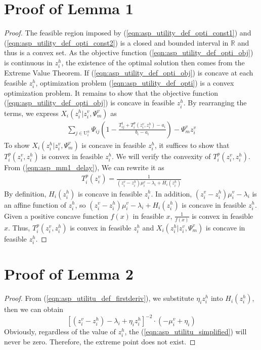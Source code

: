 \documentclass[10pt,journal, compsoc]{IEEEtran}
\begin{document}
    \section{Proof of Lemma 1}\label{appendix:lemma_1}
    \begin{proof}
    The feasible region imposed by (\ref{eqn:asp_utility_def_opti_const1}) and (\ref{eqn:asp_utility_def_opti_const2}) is a closed and bounded interval in $\mathbb{R}$ and thus is a convex set. As the objective function (\ref{eqn:asp_utility_def_opti_obj}) is continuous in $z_i^h$, the existence of the optimal solution then comes from the Extreme Value Theorem. If (\ref{eqn:asp_utility_def_opti_obj}) is concave at each feasible $z_i^h$, optimization problem (\ref{eqn:asp_utility_def_opti}) is a convex optimization problem. It remains to show that the objective function (\ref{eqn:asp_utility_def_opti_obj}) is concave in feasible $z_i^h$. By rearranging the terms, we express $X_i(z_i^h|z_i^v,\Psi_m^v)$ as
    \begin{equation}
    \begin{aligned}
        \sum_{j \in \mathrm{U}_i^{n}}\Psi_{ij}(1-\frac{T_{ij}^t+T_i^p(z_i^v, z_i^h)-a_i}{b_i-a_i})- \Psi_m^v z_i^v 
    \end{aligned}
    \end{equation}
    To show $X_i(z_i^h|z_i^v,\Psi_m^v)$ is concave in feasible $z_i^h$, it suffices to show that $T_i^p(z_i^v, z_i^h)$ is convex in feasible $z_i^h$. We will verify the convexity of $T_i^p(z_i^v, z_i^h)$. From (\ref{eqn:asp_mm1_delay}), We can rewrite it as
    \begin{equation} 
    \begin{aligned}
    T_i^p(z_i^v)=\frac{1}{(z_i^v-z_i^h)\mu_i^v - \lambda_i + H_i(z_i^h)}
    \end{aligned}
    \end{equation}
    By definition, $H_i(z_i^h)$ is concave in feasible $z_i^h$. In addition, $(z_i^v-z_i^h)\mu_i^v - \lambda_i$ is an affine function of $z_i^h$, so $(z_i^v-z_i^h)\mu_i^v - \lambda_i + H_i(z_i^h)$ is concave in feasible $z_i^h$. Given a positive concave function $f(x)$ in feasible $x$, $\frac{1}{f(x)}$ is convex in feasible $x$. Thus, $T_i^p(z_i^v, z_i^h)$ is convex in feasible $z_i^h$ and $X_i(z_i^h|z_i^v,\Psi_m^v)$ is concave in feasible $z_i^h$.
    \end{proof}

  \section{Proof of Lemma 2}\label{appendix:lemma_2}
    \begin{proof}
    From (\ref{eqn:asp_utilitu_def_firstderiv}), we substitute $\eta_i{z_i^h}$ into $H_i(z_i^h)$, then we can obtain
    \begin{equation} \label{eqn:asp_utilitu_simplified}
    [(z_i^v - z_i^h) - \lambda_i + \eta_i{z_i^h}]^{-2} \cdot (-\mu_i^v + \eta_i)
    \end{equation}
    Obviously, regardless of the value of $z_i^h$, the (\ref{eqn:asp_utilitu_simplified}) will never be zero. Therefore, the extreme point does not exist.\qedhere
    \end{proof}
\end{document}
